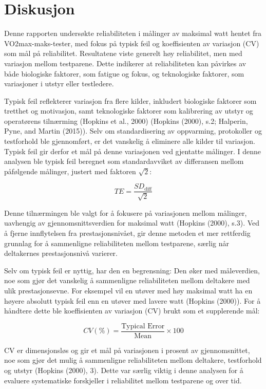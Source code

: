\documentclass[
  letterpaper,
  DIV=11,
  numbers=noendperiod]{scrreprt}
\begin{document}
\section{Diskusjon}\label{diskusjon}

Denne rapporten undersøkte reliabiliteten i målinger av maksimal watt
hentet fra VO2max-maks-tester, med fokus på typisk feil og koeffisienten
av variasjon (CV) som mål på reliabilitet. Resultatene viste generelt
høy reliabilitet, men med variasjon mellom testparene. Dette indikerer
at reliabiliteten kan påvirkes av både biologiske faktorer, som fatigue
og fokus, og teknologiske faktorer, som variasjoner i utstyr eller
testledere.

Typisk feil reflekterer variasjon fra flere kilder, inkludert biologiske
faktorer som tretthet og motivasjon, samt teknologiske faktorer som
kalibrering av utstyr og operatørens tilnærming (Hopkins et al., 2000)
(Hopkins (2000), s.2; Halperin, Pyne, and Martin (2015)). Selv om
standardisering av oppvarming, protokoller og testforhold ble
gjennomført, er det vanskelig å eliminere alle kilder til variasjon.
Typisk feil gir derfor et mål på denne variasjonen ved gjentatte
målinger. I denne analysen ble typisk feil beregnet som standardavviket
av differansen mellom påfølgende målinger, justert med faktoren
\(\sqrt{2}\):

\[
TE = \frac{SD_{\text{diff}}}{\sqrt{2}}
\]

Denne tilnærmingen ble valgt for å fokusere på variasjonen mellom
målinger, uavhengig av gjennomsnittsverdien for maksimal watt (Hopkins
(2000), s.3). Ved å fjerne innflytelsen fra prestasjonsnivået, gir denne
metoden et mer rettferdig grunnlag for å sammenligne reliabiliteten
mellom testparene, særlig når deltakernes prestasjonsnivå varierer.

Selv om typisk feil er nyttig, har den en begrensning: Den øker med
måleverdien, noe som gjør det vanskelig å sammenligne reliabiliteten
mellom deltakere med ulik prestasjonsevne. For eksempel vil en utøver
med høy maksimal watt ha en høyere absolutt typisk feil enn en utøver
med lavere watt (Hopkins (2000)). For å håndtere dette ble koeffisienten
av variasjon (CV) brukt som et supplerende mål:

\[
CV (\%) = \frac{\text{Typical Error}}{\text{Mean}}\times 100
\]

CV er dimensjonsløs og gir et mål på variasjonen i prosent av
gjennomsnittet, noe som gjør det mulig å sammenligne reliabiliteten
mellom deltakere, testforhold og utstyr (Hopkins (2000), 3). Dette var
særlig viktig i denne analysen for å evaluere systematiske forskjeller i
reliabilitet mellom testparene og over tid.
\end{document}
